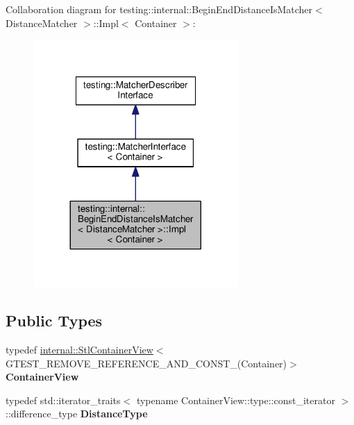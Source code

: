 Collaboration diagram for testing\+:\+:internal\+:\+:Begin\+End\+Distance\+Is\+Matcher$<$ Distance\+Matcher $>$\+:\+:Impl$<$ Container $>$\+:
\nopagebreak
\begin{figure}[H]
\begin{center}
\leavevmode
\includegraphics[width=221pt]{classtesting_1_1internal_1_1_begin_end_distance_is_matcher_1_1_impl__coll__graph}
\end{center}
\end{figure}
\subsection*{Public Types}
\begin{DoxyCompactItemize}
\item 
\mbox{\label{classtesting_1_1internal_1_1_begin_end_distance_is_matcher_1_1_impl_a5c76ede38c6143430f56e02e9024f535}} 
typedef \mbox{\hyperlink{classtesting_1_1internal_1_1_stl_container_view}{internal\+::\+Stl\+Container\+View}}$<$ G\+T\+E\+S\+T\+\_\+\+R\+E\+M\+O\+V\+E\+\_\+\+R\+E\+F\+E\+R\+E\+N\+C\+E\+\_\+\+A\+N\+D\+\_\+\+C\+O\+N\+S\+T\+\_\+(Container)$>$ {\bfseries Container\+View}
\item 
\mbox{\label{classtesting_1_1internal_1_1_begin_end_distance_is_matcher_1_1_impl_a10d901c49e2793dae6bcce6fa1a4e9fe}} 
typedef std\+::iterator\+\_\+traits$<$ typename Container\+View\+::type\+::const\+\_\+iterator $>$\+::difference\+\_\+type {\bfseries Distance\+Type}
\end{DoxyCompactItemize}
